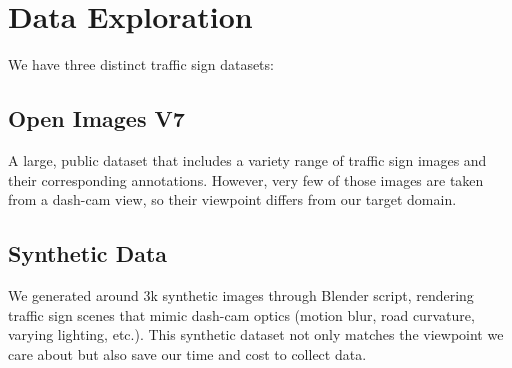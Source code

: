 \documentclass[journal]{IEEEtran}
\begin{document}
\section{Data Exploration}
We have three distinct traffic sign datasets:

\subsection{Open Images V7}
A large, public dataset that includes a variety range of traffic sign images and their corresponding annotations. However, very few of those images are taken from a dash-cam view, so their viewpoint differs from our target domain.

\subsection{Synthetic Data}
We generated around 3k synthetic images through Blender script, rendering traffic sign scenes that mimic dash-cam optics (motion blur, road curvature, varying lighting, etc.). This synthetic dataset not only matches the viewpoint we care about but also save our time and cost to collect data.
\end{document}
